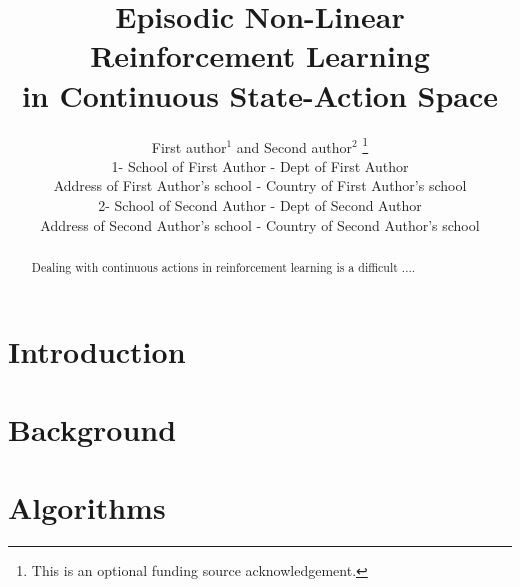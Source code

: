 \documentclass{style/esannV2}
\begin{document}
\title{Episodic Non-Linear Reinforcement Learning\\ in Continuous State-Action Space}

\author{First author$^1$ and Second author$^2$
%
\thanks{This is an optional funding source acknowledgement.}
%
\vspace{.3cm}\\
%
1- School of First Author - Dept of First Author \\
Address of First Author's school - Country of First Author's
school
%
\vspace{.1cm}\\
2- School of Second Author - Dept of Second Author \\
Address of Second Author's school - Country of Second Author's school\\
}

\maketitle

\begin{abstract}
Dealing with continuous actions in reinforcement learning is 
a difficult ....
\end{abstract}

\section{Introduction}



\section{Background}



\section{Algorithms}
\end{document}
